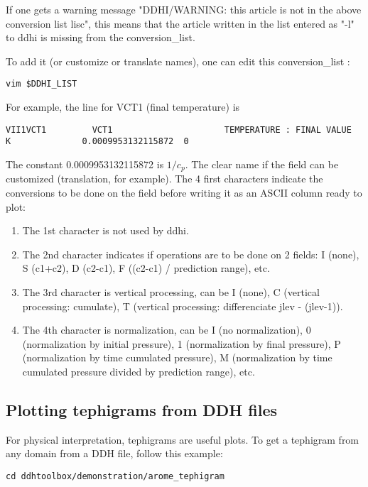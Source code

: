 \p If one gets a warning message "DDHI/WARNING: this article is not in the above conversion list lisc", this means that the article written in the list entered as "-l" to ddhi is missing from the conversion\_list.

\p To add it (or customize or translate names), one can edit this conversion\_list :
{\small \begin{verbatim} 
vim $DDHI_LIST
\end{verbatim}}

\p For example, the line for VCT1 (final temperature) is 
{\tiny \begin{verbatim} 
VII1VCT1         VCT1                      TEMPERATURE : FINAL VALUE                                   K              0.0009953132115872  0
\end{verbatim}}
\noi The constant 0.0009953132115872 is $1 / c_p$. The clear name if the field can be customized (translation, for example). The 4 first characters indicate the conversions to be done on the field before writing it as an ASCII column ready to plot:
\begin{enumerate}
  \item The 1st character is not used by ddhi.
  \item The 2nd character indicates if operations are to be done on 2 fields: I (none), S (c1+c2), D (c2-c1), F ((c2-c1) / prediction range), etc.
  \item The 3rd character is vertical processing, can be I (none), C (vertical processing: cumulate), T (vertical processing: differenciate jlev - (jlev-1)). 
  \item The 4th character is normalization, can be I (no normalization), 0 (normalization by initial pressure), 1 (normalization by final pressure), P (normalization by time cumulated pressure), M (normalization by time cumulated pressure divided by prediction range), etc.
\end{enumerate}
\subsection{Plotting tephigrams from DDH files}

\p For physical interpretation, tephigrams are useful plots. To get a tephigram from any domain from a DDH file, follow this example:

{\small \begin{verbatim} 
cd ddhtoolbox/demonstration/arome_tephigram
\end{verbatim}}

